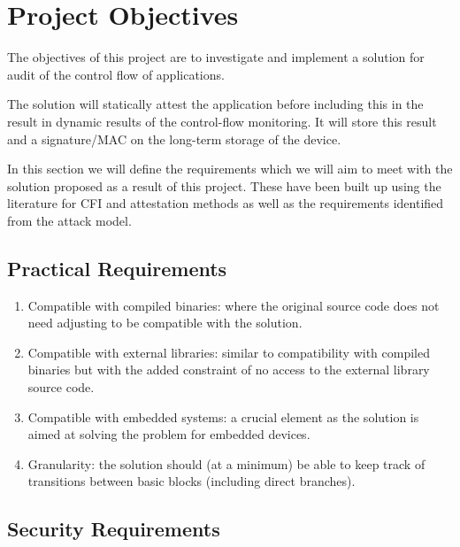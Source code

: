 \section{Project Objectives} \label{projectRequirements}

The objectives of this project are to investigate and implement a solution for audit of the control flow of applications.

The solution will statically attest the application before including this in the result in dynamic results of the control-flow monitoring. It will store this result and a signature\slash MAC on the long-term storage of the device.

In this section we will define the requirements which we will aim to meet with the solution proposed as a result of this project. These have been built up using the literature for CFI and attestation methods as well as the requirements identified from the attack model.

\subsection{Practical Requirements}

\begin{enumerate}
	\item Compatible with compiled binaries: where the original source code does not need adjusting to be compatible with the solution.
	\item Compatible with external libraries: similar to compatibility with compiled binaries but with the added constraint of no access to the external library source code. 
	\item Compatible with embedded systems: a crucial element as the solution is aimed at solving the problem for embedded devices.
	\item Granularity: the solution should (at a minimum) be able to keep track of transitions between basic blocks (including direct branches).
\end{enumerate}

\subsection{Security Requirements}
 
